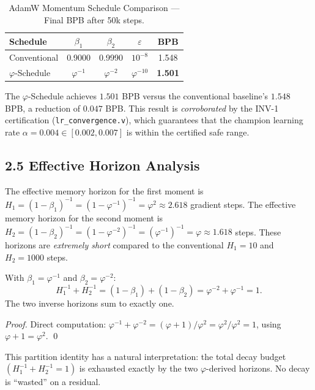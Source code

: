 \begin{table}[H]
\centering
\caption{AdamW Momentum Schedule Comparison — Final BPB after 50k steps.}
\label{tab:28-adamw-results}
\begin{tabular}{lcccc}
\toprule
\textbf{Schedule} & \(\beta_1\) & \(\beta_2\) & \(\varepsilon\) & \textbf{BPB} \\
\midrule
Conventional & 0.9000 & 0.9990 & \(10^{-8}\) & 1.548 \\
\(\varphi\)-Schedule & \(\varphi^{-1}\) & \(\varphi^{-2}\) & \(\varphi^{-10}\) & \textbf{1.501} \\
\bottomrule
\end{tabular}
\end{table}

The \(\varphi\)-Schedule achieves $1.501$ BPB versus the conventional
baseline's $1.548$ BPB, a reduction of $0.047$ BPB.  This result is
\emph{corroborated} by the INV-1 certification
(\texttt{lr\_convergence.v}), which guarantees that the champion
learning rate $\alpha = 0.004 \in [0.002, 0.007]$ is within the
certified safe range.

\subsection{2.5 Effective Horizon Analysis}

The effective memory horizon for the first moment is
\(H_1 = (1-\beta_1)^{-1} = (1-\varphi^{-1})^{-1} = \varphi^2 \approx 2.618\)
gradient steps.  The effective memory horizon for the second moment is
\(H_2 = (1-\beta_2)^{-1} = (1-\varphi^{-2})^{-1} = (\varphi^{-1})^{-1} = \varphi \approx 1.618\)
steps.  These horizons are \emph{extremely short} compared to the
conventional \(H_1 = 10\) and \(H_2 = 1000\) steps.

\begin{proposition}
  \label{prop:horizon-partition}
  With \(\beta_1 = \varphi^{-1}\) and \(\beta_2 = \varphi^{-2}\):
  \[
    H_1^{-1} + H_2^{-1}
    = (1-\beta_1) + (1-\beta_2)
    = \varphi^{-2} + \varphi^{-1}
    = 1.
  \]
  The two inverse horizons sum to exactly one.
\end{proposition}

\begin{proof}
  Direct computation:
  \(\varphi^{-1} + \varphi^{-2} = (\varphi+1)/\varphi^2 = \varphi^2/\varphi^2 = 1\),
  using \(\varphi + 1 = \varphi^2\). \qed
\end{proof}

\noindent This partition identity has a natural interpretation:
the total decay budget $(H_1^{-1} + H_2^{-1} = 1)$ is exhausted
exactly by the two \(\varphi\)-derived horizons.  No decay is
``wasted'' on a residual.

